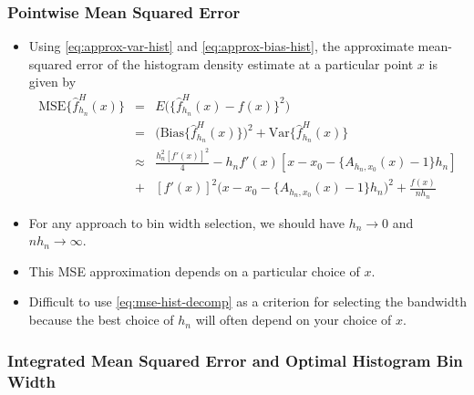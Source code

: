 \documentclass[]{book}
\begin{document}
\hypertarget{pointwise-mean-squared-error}{%
\subsubsection{Pointwise Mean Squared Error}\label{pointwise-mean-squared-error}}

\begin{itemize}
\item
  Using \eqref{eq:approx-var-hist} and \eqref{eq:approx-bias-hist}, the approximate mean-squared error of the histogram density estimate
  at a particular point \(x\) is given by
  \begin{eqnarray}
  \textrm{MSE}\{ \hat{f}_{h_{n}}^{H}(x) \} 
  &=& E\Big( \{ \hat{f}_{h_{n}}^{H}(x) - f(x) \}^{2}  \Big) \nonumber \\
  &=& \Big( \textrm{Bias}\{ \hat{f}_{h_{n}}^{H}(x) \} \Big)^{2} + \textrm{Var}\{ \hat{f}_{h_{n}}^{H}(x) \} \nonumber \\
  &\approx&  \frac{h_{n}^{2}[f'(x)]^{2} }{4} - h_{n}f'(x)[ x - x_{0} - \{ A_{h_{n}, x_{0}}(x) - 1 \}h_{n} ]  \nonumber \\
  &+& [f'(x)]^{2}\Big( x - x_{0} - \{ A_{h_{n}, x_{0}}(x) - 1 \}h_{n} \Big)^{2} + \frac{f(x)}{n h_{n} }
  \label{eq:mse-hist-decomp}
  \end{eqnarray}
\item
  For any approach to bin width selection, we should have \(h_{n} \longrightarrow 0\) and
  \(nh_{n} \longrightarrow \infty\).
\item
  This MSE approximation depends on a particular choice of \(x\).
\item
  Difficult to use \eqref{eq:mse-hist-decomp} as a criterion for selecting the bandwidth
  because the best choice of \(h_{n}\) will often depend on your choice of \(x\).
\end{itemize}

\hypertarget{integrated-mean-squared-error-and-optimal-histogram-bin-width}{%
\subsubsection{Integrated Mean Squared Error and Optimal Histogram Bin Width}\label{integrated-mean-squared-error-and-optimal-histogram-bin-width}}
\end{document}
